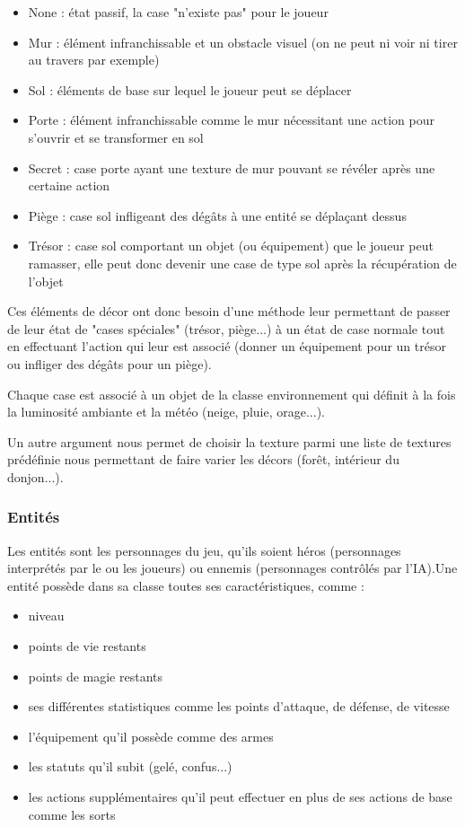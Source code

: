 \documentclass[a4paper,12pt]{article}
\begin{document}
\begin{itemize}
    \item None : état passif, la case "n'existe pas" pour le joueur
    \item Mur : élément infranchissable et un obstacle visuel (on ne peut ni voir ni tirer au travers par exemple)
    \item Sol : éléments de base sur lequel le joueur peut se déplacer
    \item Porte : élément infranchissable comme le mur nécessitant une action pour s'ouvrir et se transformer en sol
    \item Secret : case porte ayant une texture de mur pouvant se révéler après une certaine action
    \item Piège : case sol infligeant des dégâts à une entité se déplaçant dessus
    \item Trésor : case sol comportant un objet (ou équipement) que le joueur peut ramasser, elle peut donc devenir une case de type sol après la récupération de l'objet
\end{itemize}

Ces éléments de décor ont donc besoin d'une méthode leur permettant de passer de leur état de "cases spéciales" (trésor, piège...) à un état de case normale tout en effectuant l'action qui leur est associé (donner un équipement pour un trésor ou infliger des dégâts pour un piège).

Chaque case est associé à un objet de la classe environnement qui définit à la fois la luminosité ambiante et la météo (neige, pluie, orage...).

Un autre argument nous permet de choisir la texture parmi une liste de textures prédéfinie nous permettant de faire varier les décors (forêt, intérieur du donjon...).


\subsubsection{Entités}
Les entités sont les personnages du jeu, qu'ils soient héros (personnages interprétés par le ou les joueurs) ou ennemis (personnages contrôlés par l'IA).Une entité possède dans sa classe toutes ses caractéristiques, comme :
\begin{itemize}
    \item niveau
    \item points de vie restants
    \item points de magie restants
    \item ses différentes statistiques comme les points d'attaque, de défense, de vitesse
    \item l'équipement qu'il possède comme des armes
    \item les statuts qu'il subit (gelé, confus...)
    \item les actions supplémentaires qu'il peut effectuer en plus de ses actions de base comme les sorts
\end{itemize}
\end{document}
